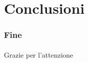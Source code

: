 \section{Conclusioni}

\begin{frame}
    \frametitle{Fine}
    \framesubtitle{}

    \begin{center}
        Grazie per l'attenzione
    \end{center}
    
\end{frame}